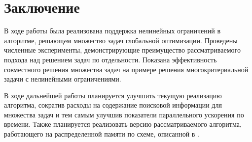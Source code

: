 \documentclass[11pt, oneside, a4paper]{article}
\begin{document}
\section{Заключение}

В ходе работы была реализована поддержка нелинейных ограничений в алгоритме, решающeм
множество задач глобальной оптимизации. Проведены численные эксперименты, демонстрирующие
преимущество рассматриваемого подхода над решением задач по отдельности. Показана эффективность
совместного решения множества задач на примере решения многокритериальной задачи с
нелинейными ограничениями.

В ходе дальнейшей работы планируется улучшить текущую реализацию алгоритма,
сократив расходы на содержание поисковой информации для множества задач и тем самым улучшив
показатели параллельного ускорения по времени. Также планируется реализовать версию
рассматриваемого алгоритма, работающего на распределенной памяти по схеме, описанной в \cite{BarkalovLebedev2017_2}.


{}
\end{document}
